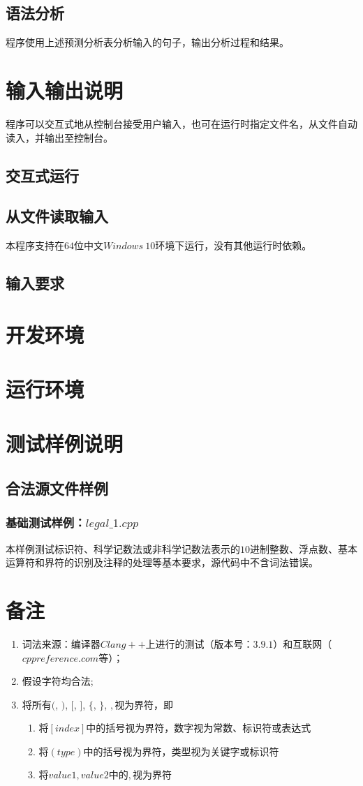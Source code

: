 \documentclass[UTF8]{ctexart}
\begin{document}
\subsection{语法分析}
程序使用上述预测分析表分析输入的句子，输出分析过程和结果。
\section{输入输出说明}
程序可以交互式地从控制台接受用户输入，也可在运行时指定文件名，从文件自动读入，并输出至控制台。
\subsection{交互式运行}
\subsection{从文件读取输入}
本程序支持在$64$位中文$Windows \ 10$环境下运行，没有其他运行时依赖。
\subsection{输入要求}
\section{开发环境}
\section{运行环境}
\section{测试样例说明}
\subsection{合法源文件样例}
\subsubsection{基础测试样例：$legal\_1.cpp$}
本样例测试标识符、科学记数法或非科学记数法表示的$10$进制整数、浮点数、基本运算符和界符的识别及注释的处理等基本要求，源代码中不含词法错误。
\section{备注}
\begin{enumerate}
	\item 词法来源：编译器$Clang++$上进行的测试（版本号：$3.9.1$）和互联网（$cppreference.com$等）；
	\item 假设字符均合法;
	\item 将所有$($, $)$, $[$, $]$, $\{$, $\}$, $,$视为界符，即
	      \begin{enumerate}
		      \item 将$[index]$中的括号视为界符，数字视为常数、标识符或表达式
		      \item 将$(type)$中的括号视为界符，类型视为关键字或标识符
		      \item 将${value1, value2}$中的$,$视为界符
	      \end{enumerate}
\end{enumerate}
\end{document}
